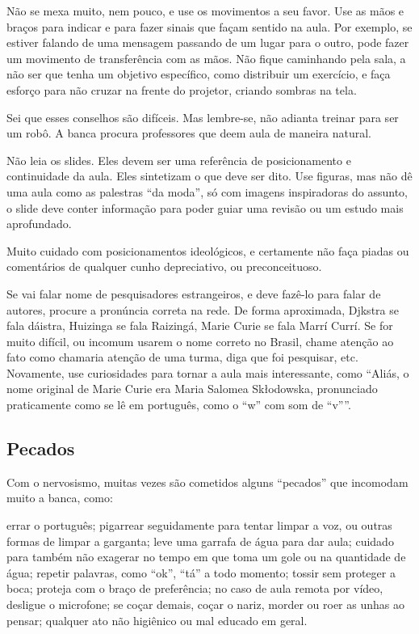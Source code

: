 \documentclass{article}
\begin{document}
Não se mexa muito, nem pouco, e use os movimentos a seu favor.  Use as mãos e braços para indicar e para fazer sinais que façam sentido na aula. Por exemplo, se estiver falando de uma mensagem passando de um lugar para o outro, pode fazer um movimento de transferência com as mãos. Não fique caminhando pela sala, a não ser que tenha um objetivo específico, como distribuir um exercício, e faça esforço para não cruzar na frente do projetor, criando sombras na tela.

Sei que esses conselhos são difíceis. Mas lembre-se, não adianta treinar para ser um robô. A banca procura professores que deem aula de maneira natural.


Não leia os slides. Eles devem ser uma referência de posicionamento e continuidade da aula. Eles sintetizam o que deve ser dito. Use figuras, mas não dê uma aula como as palestras ``da moda'', só com imagens inspiradoras do assunto, o slide deve conter informação para poder guiar uma revisão ou um estudo mais aprofundado.

Muito cuidado com posicionamentos ideológicos, e certamente não faça piadas ou comentários de qualquer cunho depreciativo, ou preconceituoso.


Se vai falar nome de pesquisadores estrangeiros, e deve fazê-lo para falar de autores, procure a pronúncia correta na rede. De forma aproximada, Djkstra se fala dáistra, Huizinga se fala Raizingá, Marie Curie se fala Marrí Currí. Se for muito difícil, ou incomum usarem o nome correto no Brasil, chame atenção ao fato como chamaria atenção de uma turma, diga que foi pesquisar, etc. Novamente, use curiosidades para tornar a aula mais interessante, como ``Aliás, o nome original de Marie Curie era Maria Salomea Sk\l odowska, pronunciado praticamente como se lê em português, como o ``w'' com som de ``v''''.

\subsection{Pecados}

Com o nervosismo, muitas vezes são cometidos alguns ``pecados'' que incomodam muito a banca, como:
\begin{outline}
\1 errar o português;
\1 pigarrear seguidamente para tentar limpar a voz, ou outras formas de limpar a garganta;
\2 leve uma garrafa de água para dar aula;
\3 cuidado para também não exagerar no tempo em que toma um gole ou na quantidade de água;
\1 repetir palavras, como ``ok'', ``tá'' a todo momento;
\1 tossir sem proteger a boca;
\2 proteja com o braço de preferência;
\2 no caso de aula remota por vídeo, desligue o microfone;
\1 se coçar demais, coçar o nariz, morder ou roer as unhas ao pensar;
\1 qualquer ato não higiênico ou mal educado em geral.
\end{outline}
\end{document}
